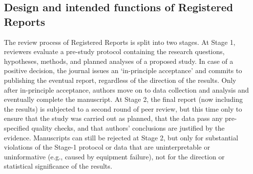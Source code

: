 \documentclass[
  british,
  a4paper,
  ,man,mask,floatsintext]{apa6}
\begin{document}
\subsection{Design and intended functions of Registered Reports}\label{design-and-intended-functions-of-registered-reports}

The review process of Registered Reports is split into two stages.
At Stage 1, reviewers evaluate a pre-study protocol containing the research questions, hypotheses, methods, and planned analyses of a proposed study.
In case of a positive decision, the journal issues an `in-principle acceptance' and commits to publishing the eventual report, regardless of the direction of the results.
Only after in-principle acceptance, authors move on to data collection and analysis and eventually complete the manuscript.
At Stage 2, the final report (now including the results) is subjected to a second round of peer review, but this time only to ensure that the study was carried out as planned, that the data pass any pre-specified quality checks, and that authors' conclusions are justified by the evidence.
Manuscripts can still be rejected at Stage 2, but only for substantial violations of the Stage-1 protocol or data that are uninterpretable or uninformative (e.g., caused by equipment failure), not for the direction or statistical significance of the results.
\end{document}
